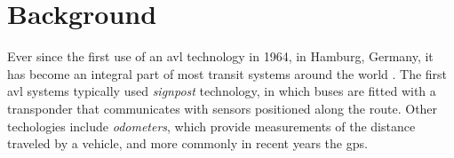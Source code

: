 \documentclass[12pt,a4paper]{article}
\begin{document}





\section{Background}
\label{sec:background}

Ever since the first use of an \gls{avl} technology in 1964, in Hamburg, Germany,
it has become an integral part of most transit systems around the world
\citep{tcrp:1997,tcrp:2003}.
The first \gls{avl} systems typically used \emph{signpost} technology,
in which buses are fitted with a transponder that communicates with 
sensors positioned along the route.
Other techologies include \emph{odometers},
which provide measurements of the distance traveled by a vehicle,
and more commonly in recent years the \gls{gps}.
\end{document}
